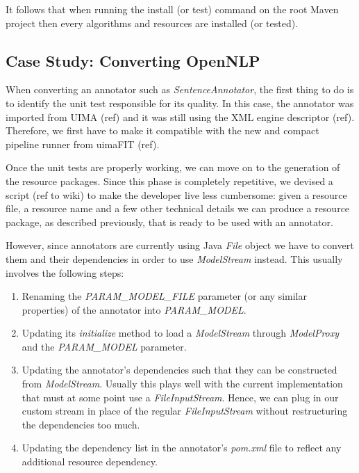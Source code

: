 \documentclass{article}
\newcommand{\id}[1]{\mbox{\textit{#1}}}
\newcommand{\TODO}[1]{\textcolor{YellowOrange}{(#1)}} %
\begin{document}
It follows that when running the install (or test) command on the root Maven project then every algorithms and resources are installed (or tested).

\subsection{Case Study: Converting OpenNLP}

When converting an annotator such as \id{SentenceAnnotator}, the first thing to do is to identify the unit test responsible for its quality. In this case, the annotator was imported from UIMA \TODO{ref} and it was still using the XML engine descriptor \TODO{ref}. Therefore, we first have to make it compatible with the new and compact pipeline runner from uimaFIT \TODO{ref}.

Once the unit tests are properly working, we can move on to the generation of the resource packages. Since this phase is completely repetitive, we devised a script \TODO{ref to wiki} to make the developer live less cumbersome: given a resource file, a resource name and a few other technical details we can produce a resource package, as described previously, that is ready to be used with an annotator.

However, since annotators are currently using Java \id{File} object we have to convert them and their dependencies in order to use \id{ModelStream} instead. This usually involves the following steps:

\begin{enumerate}

\item Renaming the \id{PARAM\_MODEL\_FILE} parameter (or any similar properties) of the annotator into \id{PARAM\_MODEL}.

\item Updating its \id{initialize} method to load a \id{ModelStream} through \id{ModelProxy} and the \id{PARAM\_MODEL} parameter. 

\item Updating the annotator's dependencies such that they can be constructed from \id{ModelStream}. Usually this plays well with the current implementation that must at some point use a \id{FileInputStream}. Hence, we can plug in our custom stream in place of the regular \id{FileInputStream} without restructuring the dependencies too much.

\item Updating the dependency list in the annotator's \id{pom.xml} file to reflect any additional resource dependency.

\end{enumerate}
\end{document}
